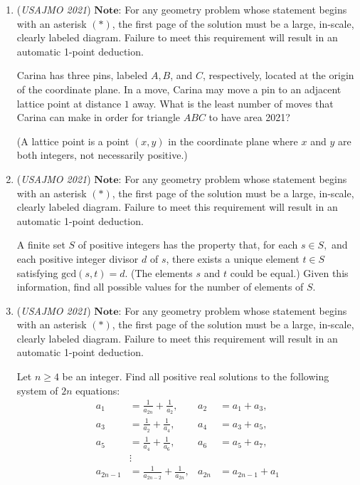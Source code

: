 \begin{enumerate}
Prove that
 \[n \leq \frac{2}{3} L^{2}.\]


	\item (\textit{USAJMO 2021}) $\textbf{Note:}$ For any geometry problem whose statement begins with an asterisk $(*)$, the first page of the solution must be a large, in-scale, clearly labeled diagram. Failure to meet this requirement will result in an automatic 1-point deduction.


 Carina has three pins, labeled $A, B$, and $C$, respectively, located at the origin of the coordinate plane. In a move, Carina may move a pin to an adjacent lattice point at distance $1$ away. What is the least number of moves that Carina can make in order for triangle $ABC$ to have area 2021? 


 (A lattice point is a point $(x, y)$ in the coordinate plane where $x$ and $y$ are both integers, not necessarily positive.) 


 

	\item (\textit{USAJMO 2021}) $\textbf{Note:}$ For any geometry problem whose statement begins with an asterisk $(*)$, the first page of the solution must be a large, in-scale, clearly labeled diagram. Failure to meet this requirement will result in an automatic 1-point deduction.


 A finite set $S$ of positive integers has the property that, for each $s \in S,$ and each positive integer divisor $d$ of $s$, there exists a unique element $t \in S$ satisfying $\text{gcd}(s, t) = d$. (The elements $s$ and $t$ could be equal.) Given this information, find all possible values for the number of elements of $S$.


 

	\item (\textit{USAJMO 2021}) $\textbf{Note:}$ For any geometry problem whose statement begins with an asterisk $(*)$, the first page of the solution must be a large, in-scale, clearly labeled diagram. Failure to meet this requirement will result in an automatic 1-point deduction.


 Let $n \geq 4$ be an integer. Find all positive real solutions to the following system of $2n$ equations: 
 \begin{align*} a_{1} &=\frac{1}{a_{2 n}}+\frac{1}{a_{2}}, & a_{2}&=a_{1}+a_{3}, \\ a_{3}&=\frac{1}{a_{2}}+\frac{1}{a_{4}}, & a_{4}&=a_{3}+a_{5}, \\ a_{5}&=\frac{1}{a_{4}}+\frac{1}{a_{6}}, & a_{6}&=a_{5}+a_{7}, \\ &\vdots \\ a_{2 n-1}&=\frac{1}{a_{2 n-2}}+\frac{1}{a_{2 n}}, & a_{2 n}&=a_{2 n-1}+a_{1} \end{align*}



\end{enumerate}